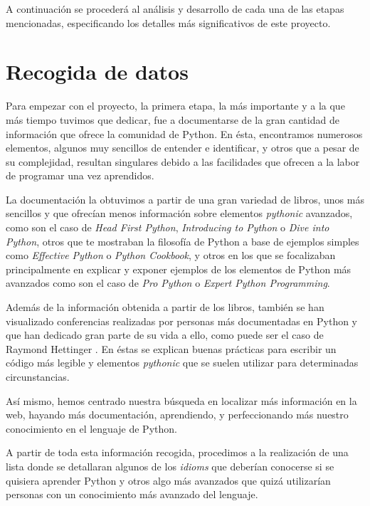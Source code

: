 \documentclass[a4paper, 12pt]{book}
\begin{document}
A continuación se procederá al análisis y desarrollo de cada una de las etapas mencionadas, especificando los detalles más significativos de este proyecto.

\section{Recogida de datos}  
\label{sec:recogida_de_datos}

Para empezar con el proyecto, la primera etapa, la más importante y a la que más tiempo tuvimos que dedicar, fue a documentarse de la gran cantidad de información que ofrece la comunidad de Python. En ésta, encontramos numerosos elementos, algunos muy sencillos de entender e identificar, y otros que a pesar de su complejidad, resultan singulares debido a las facilidades que ofrecen a la labor de programar una vez aprendidos.

La documentación la obtuvimos a partir de una gran variedad de libros, unos más sencillos y que ofrecían menos información sobre elementos \textit{pythonic} avanzados, como son el caso de \textit{Head First Python}, \textit{Introducing to Python} o \textit{Dive into Python}, otros que te mostraban la filosofía de Python a base de ejemplos simples como \textit{Effective Python} o \textit{Python Cookbook}, y otros en los que se focalizaban principalmente en explicar y exponer ejemplos de los elementos de Python más avanzados como son el caso de \textit{Pro Python} o \textit{Expert Python Programming}.

Además de la información obtenida a partir de los libros, también se han visualizado conferencias realizadas por personas más documentadas en Python y que han dedicado gran parte de su vida a ello, como puede ser el caso de Raymond Hettinger \cite{raymondhettinger}. En éstas se explican buenas prácticas para escribir un código más legible y elementos \textit{pythonic} que se suelen utilizar para determinadas circunstancias.

Así mismo, hemos centrado nuestra búsqueda en localizar más información en la web, hayando más documentación, aprendiendo, y perfeccionando más nuestro conocimiento en el lenguaje de Python.

A partir de toda esta información recogida, procedimos a la realización de una lista donde se detallaran algunos de los \textit{idioms} que deberían conocerse si se quisiera aprender Python y otros algo más avanzados que quizá utilizarían personas con un conocimiento más avanzado del lenguaje.
\end{document}
